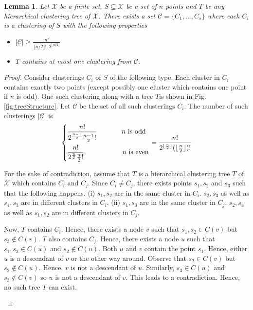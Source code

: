 \documentclass[12pt]{article}
\newtheorem{lem}[theorem]{Lemma}
\newcommand{\mc}{\mathcal}
\begin{document}
\begin{lem}
\label{lemma:treesOnX}
Let $\mc X$ be a finite set, $S \subseteq \mc X$ be a set of $n$ points and $T$ be any hierarchical clustering tree of $\mc X$. There exists a set $\mc C = \{C_1, \ldots, C_s\}$ where each $C_i$ is a clustering of $S$ with the following properties
\begin{itemize} 
	\item $|\mc C| \ge \frac{n!}{\lfloor n/2 \rfloor! \enspace 2^{\lfloor n/2 \rfloor}}$
	\item $T$ contains at most one clustering from $\mc C$. 
\end{itemize}
\end{lem}
\begin{proof}
Consider clusterings $C_i$ of $S$ of the following type. Each cluster in $C_i$ contains exactly two points (except possibly one cluster which contains one point if $n$ is odd). One such clustering along with a tree $T$is shown in Fig. \ref{fig:treeStructure}. Let $\mc C$ be the set of all such clusterings $C_i$. The number of such clusterings $|\mc C|$ is 
$$ \begin{dcases}
		\frac{n!}{2^{\frac{n-1}{2}}\frac{n-1}{2}!} \hspace{0.5in} n \text{ is odd}\\
        \frac{n!}{2^{\frac{n}{2}}\frac{n}{2}!} \hspace{0.78in} n \text{ is even}\\
	\end{dcases}= \frac{n!}{2^{\lfloor \frac{n}{2} \rfloor} (\lfloor \frac{n}{2} \rfloor)!}$$
	
For the sake of contradiction, assume that $T$ is a hierarchical clustering tree $T$ of $\mc X$ which contains $C_i$ and $C_j$. Since $C_i \neq C_j$, there exists points $s_1, s_2$ and $s_3$ such that the following happens. (i) $s_1, s_2$ are in the same cluster in $C_i$. $s_2, s_3$ as well as $s_1, s_3$ are in different clusters in $C_i$. (ii) $s_1, s_3$ are in the same cluster in $C_j$. $s_2, s_3$ as well as $s_1, s_2$ are in different clusters in $C_j$.   

Now, $T$ contains $C_i$. Hence, there exists a node $v$ such that $s_1, s_2 \in C(v)$ but $s_3 \not\in C(v)$. $T$ also contains $C_j$. Hence, there exists a node $u$ such that $s_1, s_3 \in C(u)$ and $s_2 \not\in C(u)$. Both $u$ and $v$ contain the point $s_1$. Hence, either $u$ is a descendant of $v$ or the other way around. Observe that $s_2 \in C(v)$ but $s_2 \not\in C(u)$. Hence, $v$ is not a descendant of $u$. Similarly, $s_3 \in C(u)$ and $s_3 \not\in C(v)$ so $u$ is not a descendant of $v$. This leads to a contradiction. Hence, no such tree $T$ can exist.  
\begin{figure}
	\centering
\end{figure}
\end{proof}
\end{document}
